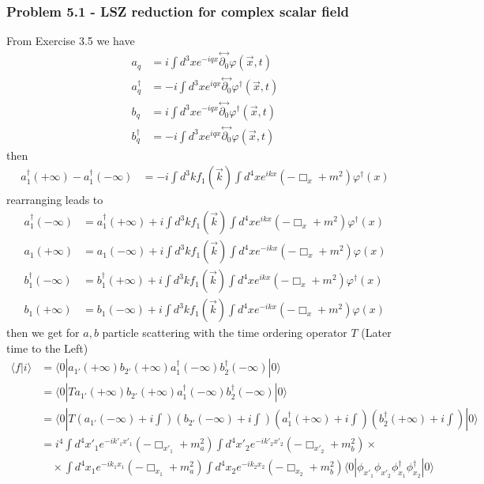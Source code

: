 \documentclass[10pt,a4paper]{article}
\theoremstyle{definition}
\begin{document}
\subsubsection{Problem 5.1 - LSZ reduction for complex scalar field}
From Exercise 3.5 we have
\begin{align}
a_q&=i\int d^3x e^{-iqx}\stackrel{\leftrightarrow}{\partial_0}\varphi(\vec{x},t)\\
a_q^\dagger&=-i\int d^3x e^{iqx}\stackrel{\leftrightarrow}{\partial_0}\varphi^\dagger(\vec{x},t)\\
b_q&=i\int d^3x e^{-iqx}\stackrel{\leftrightarrow}{\partial_0}\varphi^\dagger(\vec{x},t)\\
b_q^\dagger&=-i\int d^3x e^{iqx}\stackrel{\leftrightarrow}{\partial_0}\varphi(\vec{x},t)
\end{align}
then
\begin{align}
a^\dagger_1(+\infty)-a^\dagger_1(-\infty)
&=-i\int d^3k f_1(\vec{k})\int d^4x e^{ikx}(-\Box_x+m^2)\varphi^\dagger(x)
\end{align}
rearranging leads to
\begin{align}
a^\dagger_1(-\infty)&=a^\dagger_1(+\infty)+i\int d^3k f_1(\vec{k})\int d^4x e^{ikx}(-\Box_x+m^2)\varphi^\dagger(x)\\
a_1(+\infty)&=a_1(-\infty)+i\int d^3k f_1(\vec{k})\int d^4x e^{-ikx}(-\Box_x+m^2)\varphi(x)\\
b^\dagger_1(-\infty)&=b^\dagger_1(+\infty)+i\int d^3k f_1(\vec{k})\int d^4x e^{ikx}(-\Box_x+m^2)\varphi^\dagger(x)\\
b_1(+\infty)&=b_1(-\infty)+i\int d^3k f_1(\vec{k})\int d^4x e^{-ikx}(-\Box_x+m^2)\varphi(x)
\end{align}
then we get for $a,b$ particle scattering with the time ordering operator $T$ (Later time to the Left)
\begin{align}
\langle f|i\rangle
&=\langle 0|a_{1'}(+\infty)b_{2'}(+\infty)a^\dagger_1(-\infty)b^\dagger_2(-\infty)|0\rangle\\
&=\langle 0|Ta_{1'}(+\infty)b_{2'}(+\infty)a^\dagger_1(-\infty)b^\dagger_2(-\infty)|0\rangle\\
&=\langle 0|T(a_{1'}(-\infty)+i\int)(b_{2'}(-\infty)+i\int)(a^\dagger_{1}(+\infty)+i\int)(b^\dagger_{2}(+\infty)+i\int)|0\rangle\\
&=i^4
\int d^4x'_1e^{-ik'_1x'_1}(-\Box_{x'_1}+m_a^2)
\int d^4x'_2e^{-ik'_2x'_2}(-\Box_{x'_2}+m_b^2)\times\\
&\quad\times
\int d^4x_1e^{-ik_1x_1}(-\Box_{x_1}+m_a^2)
\int d^4x_2e^{-ik_2x_2}(-\Box_{x_2}+m_b^2)\langle0|\phi_{x'_1}\phi_{x'_2}\phi^\dagger_{x_1}\phi^\dagger_{x_2}|0\rangle
\end{align}
\end{document}
